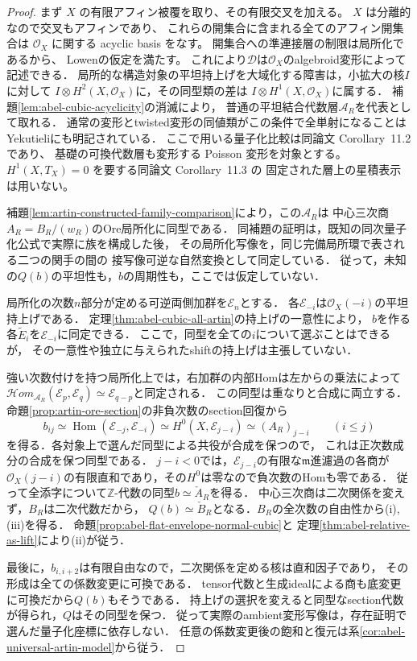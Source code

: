 \begin{proof}
まず $X$ の有限アフィン被覆を取り、その有限交叉を加える。
$X$ は分離的なので交叉もアフィンであり、
これらの開集合に含まれる全てのアフィン開集合は
$\mathcal O_X$ に関する acyclic basis をなす。
開集合への準連接層の制限は局所化であるから、
Lowen\cite[Theorems~3.14 and~3.26]{LowenRinged}の仮定を満たす。
これにより$\mathcal D$は$\mathcal O_X$のalgebroid変形によって記述できる．
局所的な構造対象の平坦持上げを大域化する障害は，小拡大の核$I$に対して
$I\otimes H^2(X,\mathcal O_X)$に，その同型類の差は
$I\otimes H^1(X,\mathcal O_X)$に属する．
補題\ref{lem:abel-cubic-acyclicity}の消滅により，
普通の平坦結合代数層$\mathscr A_R$を代表として取れる．
通常の変形とtwisted変形の同値類がこの条件で全単射になることは
Yekutieli\cite[Corollary~7.5]{YekutieliTwisted}にも明記されている．
ここで用いる量子化比較は同論文 Corollary~11.2 であり、
基礎の可換代数層も変形する Poisson 変形を対象とする。
$H^1(X,T_X)=0$ を要する同論文 Corollary~11.3 の
固定された層上の星積表示は用いない。

補題\ref{lem:artin-constructed-family-comparison}により，この$\mathscr A_R$は
中心三次商$A_R=B_R/(w_R)$のOre局所化に同型である．
同補題の証明は，既知の同次量子化公式で実際に族を構成した後，
その局所化写像を，同じ完備局所環で表される二つの関手の間の
接写像可逆な自然変換として同定している．
従って，未知の$Q(b)$の平坦性も，$b$の周期性も，ここでは仮定していない．

局所化の次数$n$部分が定める可逆両側加群を$\mathscr E_n$とする．
各$\mathscr E_{-i}$は$\mathcal O_X(-i)$の平坦持上げである．
定理\ref{thm:abel-cubic-all-artin}の持上げの一意性により，
$b$を作る各$\widetilde E_i$を$\mathscr E_{-i}$に同定できる．
ここで，同型を全ての$i$について選ぶことはできるが，
その一意性や独立に与えられたshiftの持上げは主張していない．

強い次数付けを持つ局所化上では，右加群の内部Homは左からの乗法によって
$\mathcal H om_{\mathscr A_R}(\mathscr E_p,\mathscr E_q)
 \simeq\mathscr E_{q-p}$と同定される．
この同型は重なりと合成に両立する．
命題\ref{prop:artin-ore-section}の非負次数のsection回復から
\[
 b_{ij}\simeq\operatorname{Hom}(\mathscr E_{-j},\mathscr E_{-i})
  \simeq H^0(X,\mathscr E_{j-i})
  \simeq(A_R)_{j-i}\qquad(i\le j)
\]
を得る．各対象上で選んだ同型による共役が合成を保つので，
これは正次数成分の合成を保つ同型である．
$j-i<0$では，$\mathscr E_{j-i}$の有限な$\mathfrak m$進濾過の各商が
$\mathcal O_X(j-i)$の有限直和であり，その$H^0$は零なので負次数のHomも零である．
従って全添字について$\mathbb Z$-代数の同型$b\simeq\check A_R$を得る．
中心三次商は二次関係を変えず，$B_R$は二次代数だから，
$Q(b)\simeq\check B_R$となる．$B_R$の全次数の自由性から\textup{(i),(iii)}を得る．
命題\ref{prop:abel-flat-envelope-normal-cubic}と
定理\ref{thm:abel-relative-as-lift}により\textup{(ii)}が従う．

最後に，$b_{i,i+2}$は有限自由なので，二次関係を定める核は直和因子であり，
その形成は全ての係数変更に可換である．
tensor代数と生成idealによる商も底変更に可換だから$Q(b)$もそうである．
持上げの選択を変えると同型なsection代数が得られ，$Q$はその同型を保つ．
従って実際のambient変形写像は，存在証明で選んだ量子化座標に依存しない．
任意の係数変更後の飽和と復元は系\ref{cor:abel-universal-artin-model}から従う．
\end{proof}

